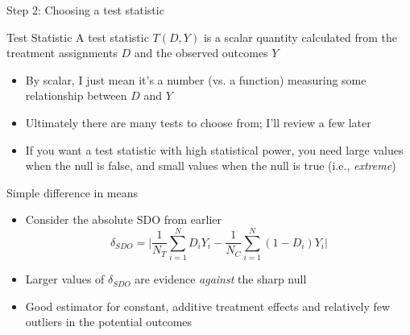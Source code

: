 \documentclass{beamer}
\begin{document}
\begin{frame}{Step 2: Choosing a test statistic}

\begin{block}{Test Statistic}
A test statistic $T(D,Y)$ is a scalar quantity calculated from the treatment assignments  $D$ and the observed outcomes $Y$ 
\end{block}

\begin{itemize}
\item By scalar, I just mean it's a number (vs. a function) measuring some relationship between $D$ and $Y$
\item Ultimately there are many tests to choose from; I'll review a few later
\item If you want a test statistic with high statistical power, you need large values when the null is false, and small values when the null is true (i.e., \emph{extreme})
\end{itemize}

\end{frame}

\begin{frame}{Simple difference in means}

\begin{itemize}
\item Consider the absolute SDO from earlier $$ \delta_{SDO} = \bigg | \frac{1}{N_T} \sum_{i=1}^N D_iY_i - \frac{1}{N_C} \sum_{i=1}^N (1-D_i)Y_i \bigg |$$
\item Larger values of $\delta_{SDO}$ are evidence \emph{against} the sharp null
\item Good estimator for constant, additive treatment effects and relatively few outliers in the potential outcomes
\end{itemize}

\end{frame}
\end{document}
